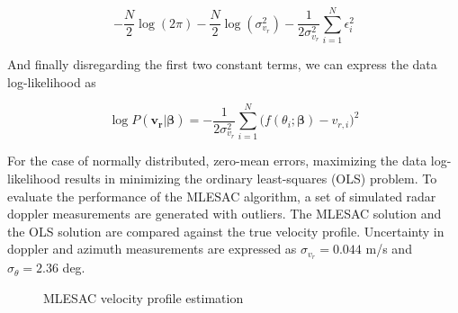 \documentclass[]{article}
\begin{document}
\begin{equation}
	-\frac{N}{2} \log(2\pi) - \frac{N}{2} \log(\sigma_{v_r}^2) - \frac{1}{2\sigma_{v_r}^2} \sum_{i=1}^N \epsilon_i^2
\end{equation}

And finally disregarding the first two constant terms, we can express the data log-likelihood as

\begin{equation}
	\log P(\mathbf{v_r} \vert \boldsymbol{\beta}) = - \frac{1}{2\sigma_{v_r}^2} \sum_{i=1}^N \big( f(\theta_i;\boldsymbol{\beta}) - v_{r,i} \big)^2
\end{equation}

For the case of normally distributed, zero-mean errors, maximizing the data log-likelihood results in minimizing the ordinary least-squares (OLS) problem. To evaluate the performance of the MLESAC algorithm, a set of simulated radar doppler measurements are generated with outliers. The MLESAC solution and the OLS solution are compared against the true velocity profile. Uncertainty in doppler and azimuth measurements are expressed as $\sigma_{v_r} = 0.044$ m/s and $\sigma_{\theta} = 2.36$ deg.

\begin{figure}[H]
	\centering
	\quad
	\caption{MLESAC velocity profile estimation}
	\label{fig:example}
\end{figure}
\end{document}
